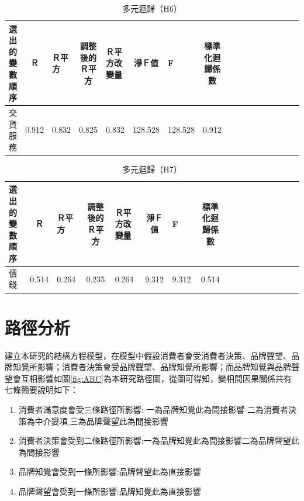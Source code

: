 \begin{table}[htb]
\caption{多元迴歸（H6）}
\label{tab:QH6}
\centering
\renewcommand{\arraystretch}{1} %
\arrayrulewidth=1pt               %
\tabcolsep=4pt                   %
\begin{tabular}[t]{lclclclclclclclcl}  %
\hline
選出的變數順序&Ｒ&Ｒ平方&調整後的Ｒ平方&Ｒ平方改變量&淨Ｆ值&F&標準化迴歸係數\\
\hline
交貨服務	&0.912 & 0.832 & 0.825	& 0.832 & 128.528	& 128.528 & 0.912\\
\hline
\end{tabular}
\end{table}

\begin{table}[htb]
\caption{多元迴歸（H7）}
\label{tab:QH7}
\centering
\renewcommand{\arraystretch}{1} %
\arrayrulewidth=1pt               %
\tabcolsep=4pt                   %
\begin{tabular}[t]{lclclclclclclclcl}  %
\hline
選出的變數順序&Ｒ&Ｒ平方&調整後的Ｒ平方&Ｒ平方改變量&淨Ｆ值&F&標準化迴歸係數\\
\hline
價錢	&0.514 & 0.264 & 0.235	& 0.264	& 9.312	& 9.312	& 0.514\\
\hline
\end{tabular}
\end{table}


\section{路徑分析}
建立本研究的結構方程模型，在模型中假設消費者會受消費者決策、品牌聲望、品牌知覺所影響；消費者決策會受品牌聲望、品牌知覺所影響；而品牌知覺與品牌聲望會互相影響如圖\ref{fig:ARC}為本研究路徑圖，從圖可得知，變相間因果關係共有七條簡要說明如下：
\begin{enumerate}
\item 消費者滿意度會受三條路徑所影響: 一為品牌知覺此為間接影響 二為消費者決策為中介變項,三為品牌聲望此為間接影響
\item 消費者決策會受到二條路徑所影響:一為品牌知覺此為間接影響二為品牌聲望此為間接影響
\item 品牌知覺會受到一條所影響:品牌聲望此為直接影響
\item 品牌聲望會受到一條所影響:品牌知覺此為直接影響
\end{enumerate}

